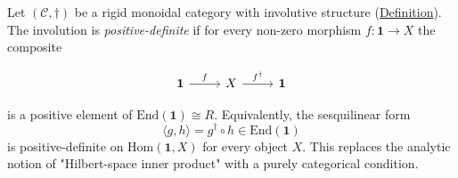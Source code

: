 \begin{definition}
  \label{def:positive-definite-dagger}
Let $(\mathcal{C}, \dagger)$ be a rigid monoidal category with involutive
structure (\hyperref[def:involutive-structure]{Definition}). The involution is
\emph{positive-definite} if for every non-zero
morphism $f \colon \mathbf{1} \to X$ the composite

\begin{equation}\label{eq:positive-definite-cd}
\begin{tikzcd}[column sep=2.5em]
  \mathbf{1} \ar[r, "f"]
  & X \ar[r, "f^{\dagger}"]
  & \mathbf{1}
\end{tikzcd}
\end{equation}

is a positive element of $\mathrm{End}(\mathbf{1}) \cong R$.
Equivalently, the sesquilinear form
\[
\langle g, h \rangle
  = g^{\dagger} \circ h
  \in \mathrm{End}(\mathbf{1})
\]
is positive-definite on $\mathrm{Hom}(\mathbf{1}, X)$ for every
object $X$. This replaces the analytic notion of "Hilbert-space inner
product" with a purely categorical condition.
\end{definition}

